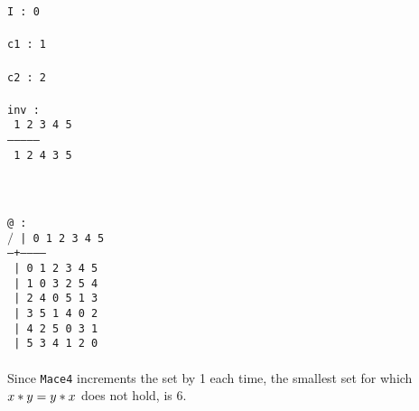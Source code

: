 \documentclass[a4paper]{article}
\begin{document}
	{\tt I : 0}\\
	{\tt }\\
	{\tt c1 : 1}\\
	{\tt }\\
	{\tt c2 : 2}\\
	{\tt }\\
	{\tt inv :}\\
	{\tt {} 1 2 3 4 5}\\
	{\tt ---------------}\\
	{\tt {} 1 2 4 3 5}\\
	{\tt }\\
	\\
	\\
	{\tt @ :}\\
	{\tt \indent $/$ | 0 1 2 3 4 5}\\
	{\tt \indent --+------------}\\
	{\tt {} | 0 1 2 3 4 5}\\
	{\tt {} | 1 0 3 2 5 4}\\
	{\tt {} | 2 4 0 5 1 3}\\
	{\tt {} | 3 5 1 4 0 2}\\
	{\tt {} | 4 2 5 0 3 1}\\
	{\tt {} | 5 3 4 1 2 0}\\
	\\
	Since {\tt Mace4} increments the set by 1 each time, the smallest set for which\\ $x \** y = y \** x$ does not hold, is 6.
	
\end{document}
